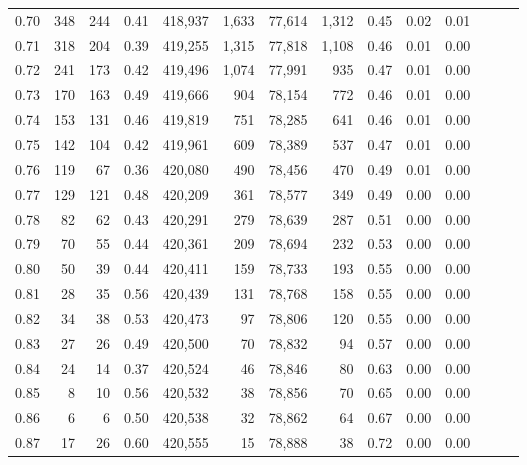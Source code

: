 \begin{tabular}{rrrrrrrrrrrrrr}
0.70 &     348 &    244 &  0.41 &  418,937 &    1,633 &  77,614 &   1,312 &  0.45 &  0.02 &      0.01 \\
0.71 &     318 &    204 &  0.39 &  419,255 &    1,315 &  77,818 &   1,108 &  0.46 &  0.01 &      0.00 \\
0.72 &     241 &    173 &  0.42 &  419,496 &    1,074 &  77,991 &     935 &  0.47 &  0.01 &      0.00 \\
0.73 &     170 &    163 &  0.49 &  419,666 &      904 &  78,154 &     772 &  0.46 &  0.01 &      0.00 \\
0.74 &     153 &    131 &  0.46 &  419,819 &      751 &  78,285 &     641 &  0.46 &  0.01 &      0.00 \\
0.75 &     142 &    104 &  0.42 &  419,961 &      609 &  78,389 &     537 &  0.47 &  0.01 &      0.00 \\
0.76 &     119 &     67 &  0.36 &  420,080 &      490 &  78,456 &     470 &  0.49 &  0.01 &      0.00 \\
0.77 &     129 &    121 &  0.48 &  420,209 &      361 &  78,577 &     349 &  0.49 &  0.00 &      0.00 \\
0.78 &      82 &     62 &  0.43 &  420,291 &      279 &  78,639 &     287 &  0.51 &  0.00 &      0.00 \\
0.79 &      70 &     55 &  0.44 &  420,361 &      209 &  78,694 &     232 &  0.53 &  0.00 &      0.00 \\
0.80 &      50 &     39 &  0.44 &  420,411 &      159 &  78,733 &     193 &  0.55 &  0.00 &      0.00 \\
0.81 &      28 &     35 &  0.56 &  420,439 &      131 &  78,768 &     158 &  0.55 &  0.00 &      0.00 \\
0.82 &      34 &     38 &  0.53 &  420,473 &       97 &  78,806 &     120 &  0.55 &  0.00 &      0.00 \\
0.83 &      27 &     26 &  0.49 &  420,500 &       70 &  78,832 &      94 &  0.57 &  0.00 &      0.00 \\
0.84 &      24 &     14 &  0.37 &  420,524 &       46 &  78,846 &      80 &  0.63 &  0.00 &      0.00 \\
0.85 &       8 &     10 &  0.56 &  420,532 &       38 &  78,856 &      70 &  0.65 &  0.00 &      0.00 \\
0.86 &       6 &      6 &  0.50 &  420,538 &       32 &  78,862 &      64 &  0.67 &  0.00 &      0.00 \\
0.87 &      17 &     26 &  0.60 &  420,555 &       15 &  78,888 &      38 &  0.72 &  0.00 &      0.00 \\

\end{tabular}
